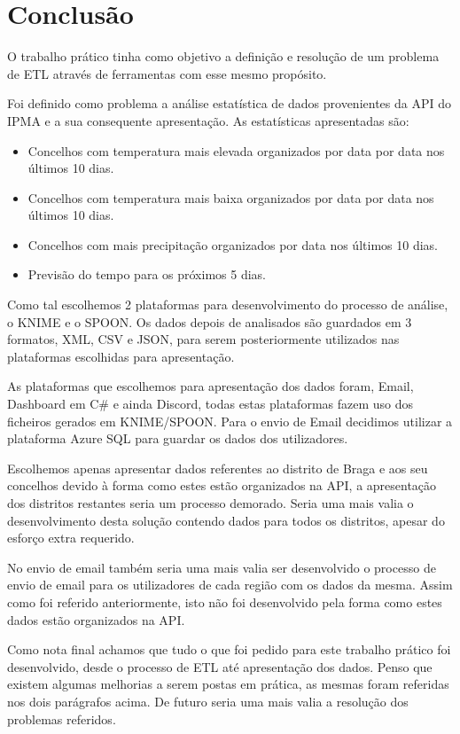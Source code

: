 \chapter{Conclusão}

O trabalho prático tinha como objetivo a definição e resolução de um problema de ETL através de ferramentas com esse mesmo propósito.

Foi definido como problema a análise estatística de dados provenientes da API do IPMA e a sua consequente apresentação. As estatísticas apresentadas são: 

\begin{itemize}
    \item Concelhos com temperatura mais elevada organizados por data por data nos últimos 10 dias. 
    \item Concelhos com temperatura mais baixa organizados por data por data nos últimos 10 dias.
    \item Concelhos com mais precipitação organizados por data nos últimos 10 dias.
    \item Previsão do tempo para os próximos 5 dias.
\end{itemize}

Como tal escolhemos 2 plataformas para desenvolvimento do processo de análise, o KNIME e o SPOON. Os dados depois de analisados são guardados em 3 formatos, XML, CSV e JSON, para serem posteriormente utilizados nas plataformas escolhidas para apresentação.

As plataformas que escolhemos para apresentação dos dados foram, Email, Dashboard em C\# e ainda Discord, todas estas plataformas fazem uso dos ficheiros gerados em KNIME/SPOON. Para o envio de Email decidimos utilizar a plataforma Azure SQL para guardar os dados dos utilizadores. 

Escolhemos apenas apresentar dados referentes ao distrito de Braga e aos seu concelhos devido à forma como estes estão organizados na API, a apresentação dos distritos restantes seria um processo demorado. Seria uma mais valia o desenvolvimento desta solução contendo dados para todos os distritos, apesar do esforço extra requerido.

No envio de email também seria uma mais valia ser desenvolvido o processo de envio de email para os utilizadores de cada região com os dados da mesma. Assim como foi referido anteriormente, isto não foi desenvolvido pela forma como estes dados estão organizados na API.

Como nota final achamos que tudo o que foi pedido para este trabalho prático foi desenvolvido, desde o processo de ETL até apresentação dos dados. Penso que existem algumas melhorias a serem postas em prática, as mesmas foram referidas nos dois parágrafos acima. De futuro seria uma mais valia a resolução dos problemas referidos.